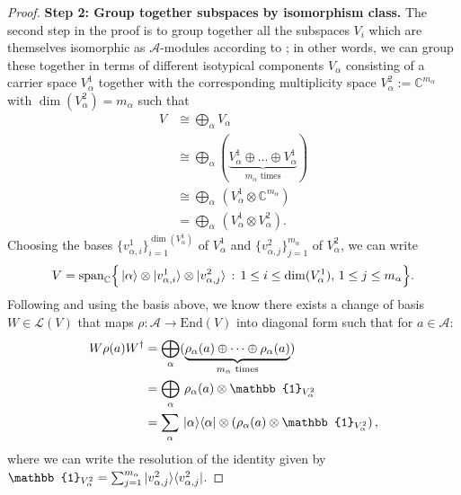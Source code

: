 \documentclass[12pt]{article}
\theoremstyle{plain}
\newcommand{\proj}[1]{\ket{#1}\!\bra{#1}}
\begin{document}
\begin{proof}
\textbf{Step 2: Group together subspaces by isomorphism class.} The second step in the proof is to group together all the subspaces $V_i$ which are themselves isomorphic as $\mathcal{A}$-modules according to ; in other words, we can group these together in terms of different isotypical components $V_\alpha$ consisting of a carrier space $V_\alpha^1$ together with the corresponding multiplicity space $V_\alpha^2 := \mathbb{C}^{m_\alpha}$ with $\dim(V_\alpha^2)=m_\alpha$ such that
\begin{align}
V & \cong \bigoplus_\alpha V_\alpha\\
&\cong\bigoplus_\alpha (\underbrace{V_\alpha^1 \oplus \dots \oplus V_\alpha^1}_{m_\alpha \text{ times}})\\
&\cong \bigoplus_\alpha \, (V_\alpha^1 \otimes \mathbb{C}^{m_\alpha})\\
&= \bigoplus_\alpha \, (V^1_\alpha \otimes V^2_\alpha).
\end{align}
Choosing the bases $\{v_{\alpha,i}^1\}_{i=1}^{\dim(V_\alpha^1)}$ of $V_\alpha^1$ and $\{v_{\alpha,j}^2\}_{j=1}^{m_\alpha}$ of $V_\alpha^2$, we can write
$$
V = \mathrm{span}_{\mathbb{C}}\Big\{\ket{\alpha} \otimes \ket{v_{\alpha,i}^1} \otimes \ket{v_{\alpha,j}^2} \, : \,  1 \leq i \leq \dim(V_\alpha^1), \, 1 \leq j \leq m_\alpha\Big\}.
$$
Following  and using the basis above, we know there exists a change of basis $W \in \mathcal{L}(V)$ that maps $\rho: \mathcal{A} \rightarrow \mathrm{End}(V)$ into diagonal form such that for $a \in \mathcal{A}$:
\begin{align}
W\rho(a)W^\dag &=\bigoplus_\alpha (\underbrace{\rho_{\alpha}(a) \oplus \dots \oplus \rho_{\alpha}(a)}_{m_\alpha \text{ times}})\\
&=\bigoplus_{\alpha} \, \rho_{\alpha}(a) \otimes \mathbb{1}_{V_\alpha^2}\\
&=\sum_{\alpha} \,\proj{\alpha} \otimes (\rho_{\alpha}(a) \otimes \mathbb{1}_{V_\alpha^2}) \, ,
\end{align}
where we can write the resolution of the identity given by $\mathbb{1}_{V_\alpha^2} = \sum_{j=1}^{m_\alpha} \proj{v_{\alpha,j}^2}$. 



\end{proof}
\end{document}
